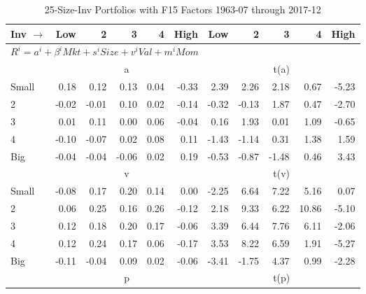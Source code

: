 
\begin{table}[!ht]
\footnotesize
\centering
\caption{25-Size-Inv Portfolios with F15 Factors 1963-07 through 2017-12}
\begin{tabular}{lrrrrrrrrrr}
  \toprule
    Inv $\rightarrow$ & Low & 2 & 3 & 4 & High & Low & 2 & 3 & 4 & High \\ 
  \midrule
  \multicolumn{11}{l}{$R^i=a^i+\beta^iMkt+s^iSize+v^iVal+m^iMom$} \\

  
    
      & \multicolumn{5}{c}{a} & \multicolumn{5}{c}{t(a)}
    
    \\
      \cmidrule(r){2-6} \cmidrule(r){7-11}

    Small   & 0.18  & 0.12  & 0.13  & 0.04  & -0.33  & 2.39  & 2.26  & 2.18  & 0.67  & -5.23  \\
         2  & -0.02  & -0.01  & 0.10  & 0.02  & -0.14  & -0.32  & -0.13  & 1.87  & 0.47  & -2.70  \\
         3  & 0.01  & 0.11  & 0.00  & 0.06  & -0.04  & 0.16  & 1.93  & 0.01  & 1.09  & -0.65  \\
         4  & -0.10  & -0.07  & 0.02  & 0.08  & 0.11  & -1.43  & -1.14  & 0.31  & 1.38  & 1.59  \\
    Big     & -0.04  & -0.04  & -0.06  & 0.02  & 0.19  & -0.53  & -0.87  & -1.48  & 0.46  & 3.43  \\

  
    
      & \multicolumn{5}{c}{v} & \multicolumn{5}{c}{t(v)}
    
    \\
      \cmidrule(r){2-6} \cmidrule(r){7-11}

    Small   & -0.08  & 0.17  & 0.20  & 0.14  & 0.00  & -2.25  & 6.64  & 7.22  & 5.16  & 0.07  \\
         2  & 0.06  & 0.25  & 0.16  & 0.26  & -0.12  & 2.18  & 9.33  & 6.22  & 10.86  & -5.10  \\
         3  & 0.12  & 0.18  & 0.20  & 0.17  & -0.06  & 3.39  & 6.44  & 7.76  & 6.11  & -2.06  \\
         4  & 0.12  & 0.24  & 0.17  & 0.06  & -0.17  & 3.53  & 8.22  & 6.59  & 1.91  & -5.27  \\
    Big     & -0.11  & -0.04  & 0.09  & 0.02  & -0.06  & -3.41  & -1.75  & 4.37  & 0.99  & -2.28  \\

  
    
      & \multicolumn{5}{c}{p} & \multicolumn{5}{c}{t(p)}
    

\end{tabular}
\end{table}
